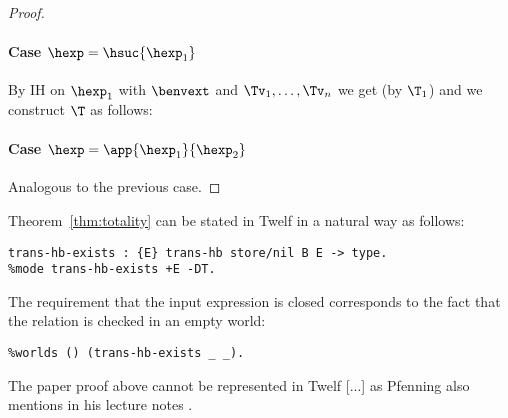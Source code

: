 \begin{proof}
\paragraph{Case $\hexp = \hsuc{\hexp_1}$}
By IH on $\hexp_1$ with $\benvext$ and $\Tv_1, \ldots, \Tv_n$ we get  (by $\T_1$) and we construct $\T$ as follows:
\begin{prooftree}
\end{prooftree}

\paragraph{Case $\hexp = \app{\hexp_1}{\hexp_2}$}
Analogous to the previous case.

\end{proof}

\Twelf

Theorem~\ref{thm:totality} can be stated in Twelf in a natural way as follows:
\begin{verbatim}
trans-hb-exists : {E} trans-hb store/nil B E -> type.
%mode trans-hb-exists +E -DT.
\end{verbatim}
The requirement that the input \hlang expression is closed corresponds to the fact that the relation is checked in an empty world:
\begin{verbatim}
%worlds () (trans-hb-exists _ _).
\end{verbatim}

The paper proof above cannot be represented in Twelf [...] as Pfenning also mentions in his lecture notes \cite{Pfenning01}.



